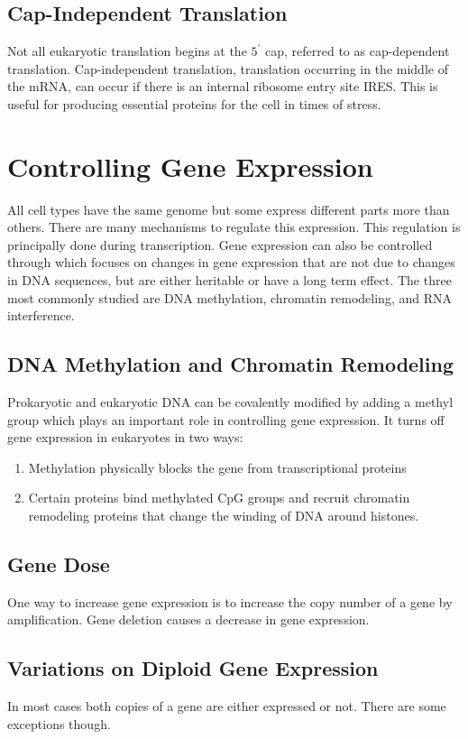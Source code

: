\documentclass[../Bio_chemistryReview.tex]{subfiles}
\begin{document}
\subsection{Cap-Independent Translation}
Not all eukaryotic translation begins at the $ 5^{\prime} $ cap, referred to as
cap-dependent translation. Cap-independent translation, translation occurring in
the middle of the mRNA, can occur if there is an internal ribosome entry site
IRES. This is useful for producing essential proteins for the cell in times of
stress.

\section{Controlling Gene Expression}
All cell types have the same genome but some express different parts more than
others. There are many mechanisms to regulate this expression. This regulation
is principally done during transcription. Gene expression can also be controlled
through  which focuses on changes in gene expression that
are not due to changes in DNA sequences, but are either heritable or have a long
term effect. The three most commonly studied are DNA methylation, chromatin
remodeling, and RNA interference.

\subsection{DNA Methylation and Chromatin Remodeling}
Prokaryotic and eukaryotic DNA can be covalently modified by adding a methyl
group which plays an important role in controlling gene expression. It
turns off gene expression in eukaryotes in two ways:
\begin{enumerate}
  \item Methylation physically blocks the gene from transcriptional proteins
  \item Certain proteins bind methylated CpG groups and recruit chromatin
    remodeling proteins that change the winding of DNA around histones.
\end{enumerate}

\subsection{Gene Dose}
One way to increase gene expression is to increase the copy number of a gene by
amplification. Gene deletion causes a decrease in gene expression.

\subsection{Variations on Diploid Gene Expression}
In most cases both copies of a gene are either expressed or not. There are some
exceptions though.
\end{document}
